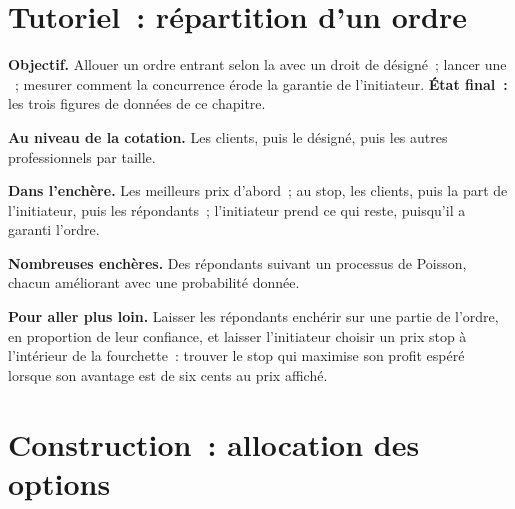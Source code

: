 \section{Tutoriel~: répartition d'un ordre}\label{tut:m1:options-market-structure:alloc}

\begin{tutorial}
\textbf{Objectif.} Allouer un ordre entrant selon la  avec un
droit de  désigné~; lancer une ~; mesurer comment
la concurrence érode la garantie de l'initiateur. \textbf{État final~:} les trois
figures de données de ce chapitre.
\begin{tutsteps}
\item \textbf{Au niveau de la cotation.} Les clients, puis le  désigné, puis les
autres professionnels par taille.
\label{lst:m1:options-market-structure:alloc}
\item \textbf{Dans l'enchère.} Les meilleurs prix d'abord~; au stop, les clients,
puis la part de l'initiateur, puis les répondants~; l'initiateur prend ce qui
reste, puisqu'il a garanti l'ordre.
\label{lst:m1:options-market-structure:auction}
\item \textbf{Nombreuses enchères.} Des répondants suivant un processus de Poisson, chacun améliorant avec une
probabilité donnée.
\end{tutsteps}
\textbf{Pour aller plus loin.} Laisser les répondants enchérir sur une partie de l'ordre, en
proportion de leur confiance, et laisser l'initiateur choisir un prix stop
à l'intérieur de la fourchette~: trouver le stop qui maximise son profit espéré lorsque son
avantage est de six cents au prix affiché.
\end{tutorial}

\section{Construction~: allocation des options}\label{bld:m1:options-market-structure:optmatch}

